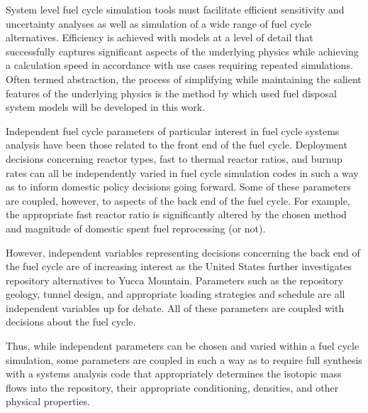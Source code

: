 
System level fuel cycle simulation tools must facilitate efficient sensitivity 
and uncertainty analyses as well as simulation of a wide range of fuel cycle 
alternatives.  Efficiency is achieved with models at a level of detail that 
successfully captures significant aspects of the underlying physics while 
achieving a calculation speed in accordance with use cases requiring repeated 
simulations. Often termed abstraction, the process of simplifying while 
maintaining the salient features of the underlying physics is the method by 
which used fuel disposal system models will be developed in this work. 


Independent fuel cycle parameters of particular interest in fuel cycle systems 
analysis have been those related to the front end of the fuel cycle. Deployment 
decisions concerning reactor types, fast to thermal reactor ratios, and burnup 
rates can all be independently varied in fuel cycle simulation codes in such a 
way as to inform domestic policy decisions going forward. Some of these 
parameters are coupled, however, to aspects of the back end of the fuel cycle.  
For example, the appropriate fast reactor ratio is significantly altered by the 
chosen method and magnitude of domestic spent fuel reprocessing (or not).


However, independent variables representing decisions concerning the back end
of the fuel cycle are of increasing interest as the United States further
investigates repository alternatives to Yucca Mountain.  Parameters such as the
repository geology, tunnel design, and appropriate loading strategies and
schedule are all independent variables up for debate. All of these
parameters are coupled with decisions about the fuel cycle. 


Thus, while independent parameters can be chosen and varied
within a fuel cycle simulation, some parameters are coupled in such a way as to
require full synthesis with a systems analysis code that appropriately
determines the isotopic mass flows into the repository, their appropriate
conditioning, densities, and other physical properties.  

